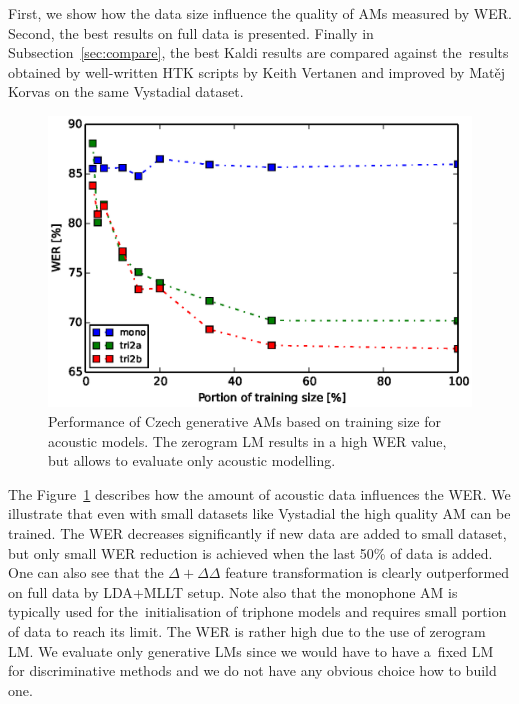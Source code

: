 First, we show how the data size influence the quality of \acp{AM} measured by \ac{WER}.
Second,  the best results on full data is presented.
Finally in Subsection~\ref{sec:compare}, the best Kaldi results are compared against the~results obtained by well-written \ac{HTK} scripts by Keith Vertanen and improved by Matěj Korvas \cite{korvas_2014} on the same Vystadial dataset.

\begin{figure}[!htp]
    \begin{center}
    \includegraphics[scale=0.7]{images/partial-zerogram.ps}
    \caption{Performance of Czech generative \acp{AM} based on training size for acoustic models. The zerogram LM results in a high WER value, but allows to evaluate only acoustic modelling.}
    \label{fig:partials} 
    \end{center}
\end{figure}

The Figure~\ref{fig:partials} describes how the amount of acoustic data influences the \ac{WER}.
We illustrate that even with small datasets like Vystadial the high quality \ac{AM} can be trained.
The WER decreases significantly if new data are added to small dataset, but only small \ac{WER} reduction is achieved when the last 50\% of data is added.
One can also see that the $\Delta+\Delta\Delta$ feature transformation is clearly outperformed on full data by \ac{LDA}+\ac{MLLT} setup.
Note also that the monophone \ac{AM} is typically used for the~initialisation of triphone models and requires small portion of data to reach its limit.
The WER is rather high due to the use of zerogram \ac{LM}.
We evaluate only generative \acp{LM} since we would have to have a~fixed LM for discriminative methods and we do not have any obvious choice how to build one.


